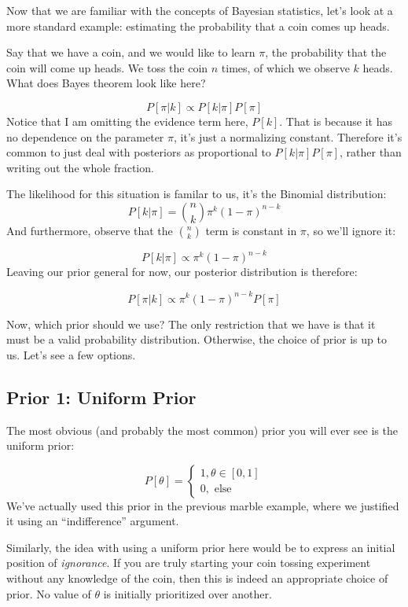 \documentclass[
]{article}
\begin{document}
Now that we are familiar with the concepts of Bayesian statistics, let's
look at a more standard example: estimating the probability that a coin
comes up heads.

Say that we have a coin, and we would like to learn \(\pi\), the
probability that the coin will come up heads. We toss the coin \(n\)
times, of which we observe \(k\) heads. What does Bayes theorem look
like here?

\[
P[\pi | k] \propto P[k| \pi] P[\pi]
\] Notice that I am omitting the evidence term here, \(P[k]\). That is
because it has no dependence on the parameter \(\pi\), it's just a
normalizing constant. Therefore it's common to just deal with posteriors
as proportional to \(P[k| \pi] P[\pi]\), rather than writing out the
whole fraction.

The likelihood for this situation is familar to us, it's the Binomial
distribution: \[
 P[k| \pi] = {n \choose k} \pi^k (1-\pi)^{n-k}
\] And furthermore, observe that the \({n \choose k}\) term is constant
in \(\pi\), so we'll ignore it:

\[
P[k| \pi] \propto \pi^k (1-\pi)^{n-k}
\] Leaving our prior general for now, our posterior distribution is
therefore:

\[
P[\pi|k] \propto \pi^k (1-\pi)^{n-k} P[\pi]
\]

Now, which prior should we use? The only restriction that we have is
that it must be a valid probability distribution. Otherwise, the choice
of prior is up to us. Let's see a few options.

\hypertarget{prior-1-uniform-prior}{%
\subsection{Prior 1: Uniform Prior}\label{prior-1-uniform-prior}}

The most obvious (and probably the most common) prior you will ever see
is the uniform prior:

\[
P[\theta] = \begin{cases}
1, \theta \in [0,1]\\
0, \text{ else}
\end{cases}
\] We've actually used this prior in the previous marble example, where
we justified it using an ``indifference'' argument.

Similarly, the idea with using a uniform prior here would be to express
an initial position of \emph{ignorance}. If you are truly starting your
coin tossing experiment without any knowledge of the coin, then this is
indeed an appropriate choice of prior. No value of \(\theta\) is
initially prioritized over another.
\end{document}
